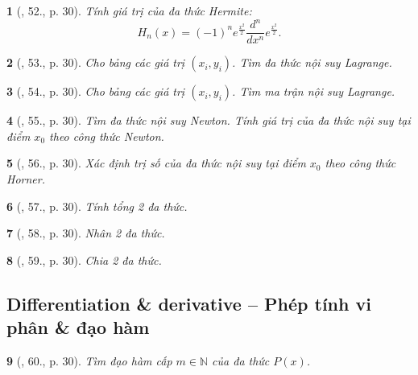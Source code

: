 \documentclass{article}
\newtheorem{baitoan}{}
\begin{document}
\begin{baitoan}[\cite{Doanh_Tuan_Pascal}, 52., p. 30]
	Tính giá trị của đa thức Hermite:
	\begin{equation}
		H_n(x) = (-1)^ne^{\frac{x^2}{2}}\frac{d^n}{dx^n}e^{\frac{x^2}{2}}.
	\end{equation}
\end{baitoan}

\begin{baitoan}[\cite{Doanh_Tuan_Pascal}, 53., p. 30]
	Cho bảng các giá trị $(x_i,y_i)$. Tìm đa thức nội suy Lagrange.
\end{baitoan}

\begin{baitoan}[\cite{Doanh_Tuan_Pascal}, 54., p. 30]
	Cho bảng các giá trị $(x_i,y_i)$. Tìm ma trận nội suy Lagrange.
\end{baitoan}

\begin{baitoan}[\cite{Doanh_Tuan_Pascal}, 55., p. 30]
	Tìm đa thức nội suy Newton. Tính giá trị của đa thức nội suy tại điểm $x_0$ theo công thức Newton.
\end{baitoan}

\begin{baitoan}[\cite{Doanh_Tuan_Pascal}, 56., p. 30]
	Xác định trị số của đa thức nội suy tại điểm $x_0$ theo công thức Horner.
\end{baitoan}

\begin{baitoan}[\cite{Doanh_Tuan_Pascal}, 57., p. 30]
	Tính tổng 2 đa thức.
\end{baitoan}

\begin{baitoan}[\cite{Doanh_Tuan_Pascal}, 58., p. 30]
	Nhân 2 đa thức.
\end{baitoan}

\begin{baitoan}[\cite{Doanh_Tuan_Pascal}, 59., p. 30]
	Chia 2 đa thức.
\end{baitoan}


\subsection{Differentiation \& derivative -- Phép tính vi phân \& đạo hàm}

\begin{baitoan}[\cite{Doanh_Tuan_Pascal}, 60., p. 30]
	Tìm đạo hàm cấp $m\in\mathbb{N}$ của đa thức $P(x)$.
\end{baitoan}
\end{document}
